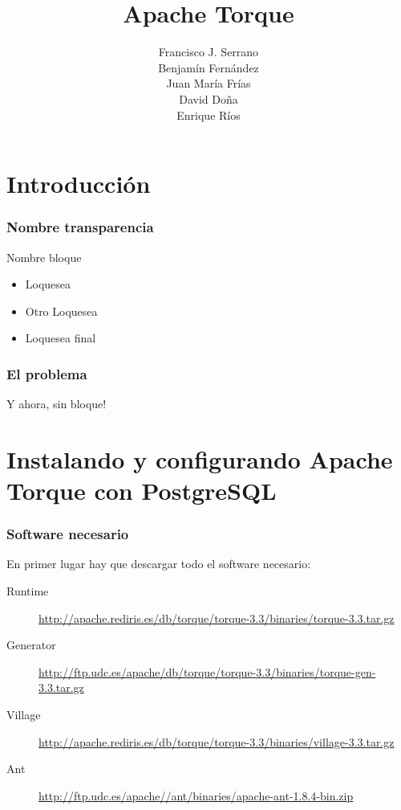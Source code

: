\documentclass[24pt, a4paper, oneside, spanish]{beamer}
\begin{document}
\title{Apache Torque}
\author{
	Francisco J. Serrano\\
	Benjamín Fernández\\
	Juan María Frías\\
	David Doña\\
	Enrique Ríos
}

\begin{frame}
\titlepage
\end{frame}

\section{Introducción}

\begin{frame}
	\frametitle{Nombre transparencia}
	
	\begin{block}{Nombre bloque}
		\pause
		
		\begin{itemize}
		\item Loquesea
		\pause
		\item Otro Loquesea
		\pause
		\item Loquesea final
		\end{itemize}
	\end{block}
\end{frame}

\begin{frame}
	\frametitle{El problema}
	Y ahora, sin \pause bloque!
\end{frame}

\section{Instalando y configurando Apache Torque con PostgreSQL}

\begin{frame}
	\frametitle{Software necesario}
	
	En primer lugar hay que descargar todo el software necesario:
	\begin{description}
	\item[Runtime] \url{http://apache.rediris.es/db/torque/torque-3.3/binaries/torque-3.3.tar.gz}
	\item[Generator] \url{http://ftp.udc.es/apache/db/torque/torque-3.3/binaries/torque-gen-3.3.tar.gz}
	\item[Village] \url{http://apache.rediris.es/db/torque/torque-3.3/binaries/village-3.3.tar.gz}
	\item[Ant] \url{http://ftp.udc.es/apache//ant/binaries/apache-ant-1.8.4-bin.zip}
	\end{description}
\end{frame}
\end{document}
